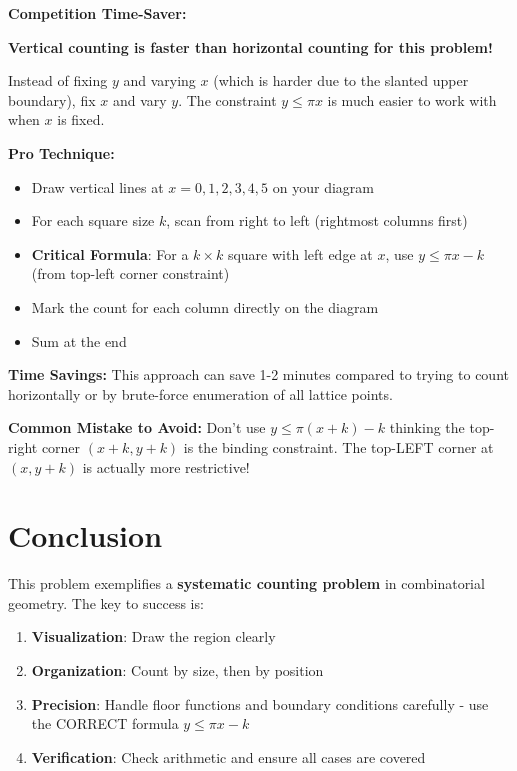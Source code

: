 \documentclass[12pt]{article}
\begin{document}
\begin{protipbox}
\textbf{Competition Time-Saver:}

\textbf{Vertical counting is faster than horizontal counting for this problem!}

Instead of fixing $y$ and varying $x$ (which is harder due to the slanted upper boundary), fix $x$ and vary $y$. The constraint $y \leq \pi x$ is much easier to work with when $x$ is fixed.

\textbf{Pro Technique:}
\begin{itemize}
    \item Draw vertical lines at $x = 0, 1, 2, 3, 4, 5$ on your diagram
    \item For each square size $k$, scan from right to left (rightmost columns first)
    \item \textbf{Critical Formula}: For a $k \times k$ square with left edge at $x$, use $y \leq \pi x - k$ (from top-left corner constraint)
    \item Mark the count for each column directly on the diagram
    \item Sum at the end
\end{itemize}

\textbf{Time Savings:} This approach can save 1-2 minutes compared to trying to count horizontally or by brute-force enumeration of all lattice points.

\textbf{Common Mistake to Avoid:} Don't use $y \leq \pi(x+k) - k$ thinking the top-right corner $(x+k, y+k)$ is the binding constraint. The top-LEFT corner at $(x, y+k)$ is actually more restrictive!
\end{protipbox}

\section{Conclusion}

This problem exemplifies a \textbf{systematic counting problem} in combinatorial geometry. The key to success is:

\begin{enumerate}
    \item \textbf{Visualization}: Draw the region clearly
    \item \textbf{Organization}: Count by size, then by position
    \item \textbf{Precision}: Handle floor functions and boundary conditions carefully - use the CORRECT formula $y \leq \pi x - k$
    \item \textbf{Verification}: Check arithmetic and ensure all cases are covered
\end{enumerate}
\end{document}
